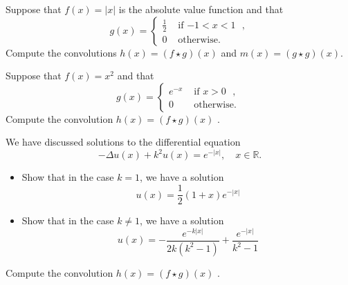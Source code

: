 \documentclass[11pt]{article}
\begin{document}

\begin{exercise}
    Suppose that $f(x) = |x|$ is the absolute value function and that 
    \[
        g(x) = \left\{\begin{array}{cc} \frac 1 2 & \text{ if $-1 < x < 1$ }, \\ 0 & \text{ otherwise. } \end{array}\right.
    \]
    Compute the convolutions $h(x) = (f \star g)(x)$ and $m(x) = (g \star g)(x)$.
\end{exercise}
\begin{solution}     
\end{solution}


\begin{exercise}
    Suppose that $f(x) = x^2$ and that
    \[
        g(x) = \left\{\begin{array}{cc} e^{-x} & \text{ if $x > 0$ }, \\ 0 & \text{ otherwise. } \end{array}\right.
    \]
    Compute the convolution $h(x) = (f \star g)(x)$ .
\end{exercise}

\begin{solution}     
\end{solution}


\begin{exercise}
    We have discussed solutions to the differential equation 
    \[
        - \Delta u(x) + k^2 u(x) = e^{-|x|}, \quad x \in \mathbb R.
    \]
    \begin{itemize}
        \item 
        Show that in the case $k=1$, we have a solution 
        \[
            u(x) = \frac 1 2 (1+x) e^{-|x|} 
        \]
        \item 
        Show that in the case $k \neq 1$, we have a solution 
        \[
            u(x) = - \frac{ e^{-k|x|} }{ 2k (k^2-1) } + \frac{ e^{-|x|} }{ k^2-1 }
        \]
    \end{itemize}
    Compute the convolution $h(x) = (f \star g)(x)$ .
\end{exercise}

\begin{solution}     
\end{solution}
\end{document}
